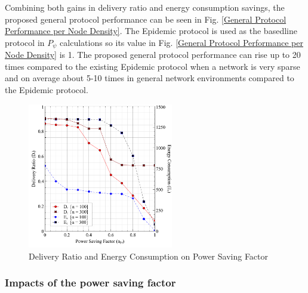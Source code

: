 Combining both gains in delivery ratio and energy consumption savings, the proposed general protocol performance can be seen in Fig. \ref{General Protocol Performance per Node Density}. 
%
The Epidemic protocol is used as the basedline protocol in $P_{\psi}$ calculations so its value in Fig. \ref{General Protocol Performance per Node Density} is 1.
%
The proposed general protocol performance can rise up to 20 times compared to the existing Epidemic protocol when a network is very sparse and on average about 5-10 times in general network environments compared to the Epidemic protocol.

\begin{figure}[!t]
\centering
\includegraphics[width=2.5in]{Graphs/NpsDeliveryPerformanceAndDeliveryRatio.pdf}
\caption{Delivery Ratio and Energy Consumption on Power Saving Factor}
\label{The Optimum between Delivery Ratio and protocol Performance}
\end{figure}

\subsubsection{Impacts of the power saving factor}


